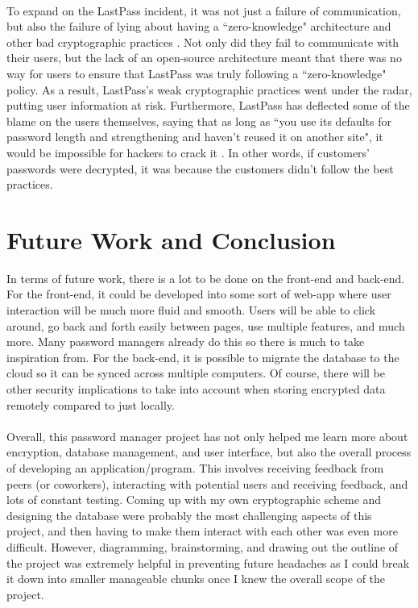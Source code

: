 \documentclass[10pt,twocolumn]{article}
\begin{document}
\paragraph{}
To expand on the LastPass incident, it was not just a failure of communication, but also the failure of lying about having a ``zero-knowledge" architecture and other bad cryptographic practices \cite{clark_2022}. Not only did they fail to communicate with their users, but the lack of an open-source architecture meant that there was no way for users to ensure that LastPass was truly following a ``zero-knowledge" policy. As a result, LastPass's weak cryptographic practices went under the radar, putting user information at risk. Furthermore, LastPass has deflected some of the blame on the users themselves, saying that as long as ``you use its defaults for password length and strengthening and haven't reused it on another site", it would be impossible for hackers to crack it \cite{clark_2022}. In other words, if customers' passwords were decrypted, it was because the customers didn't follow the best practices. 

\section{Future Work and Conclusion}
In terms of future work, there is a lot to be done on the front-end and back-end. For the front-end, it could be developed into some sort of web-app where user interaction will be much more fluid and smooth. Users will be able to click around, go back and forth easily between pages, use multiple features, and much more. Many password managers already do this so there is much to take inspiration from.  For the back-end, it is possible to migrate the database to the cloud so it can be synced across multiple computers. Of course, there will be other security implications to take into account when storing encrypted data remotely compared to just locally. 
\paragraph{}
Overall, this password manager project has not only helped me learn more about encryption, database management, and user interface, but also the overall process of developing an application/program. This involves receiving feedback from peers (or coworkers), interacting with potential users and receiving feedback, and lots of constant testing. Coming up with my own cryptographic scheme and designing the database were probably the most challenging aspects of this project, and then having to make them interact with each other was even more difficult. However, diagramming, brainstorming, and drawing out the outline of the project was extremely helpful in preventing future headaches as I could break it down into smaller manageable chunks once I knew the overall scope of the project.
\end{document}
